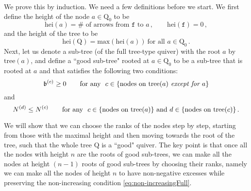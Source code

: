 \documentclass[12pt,a4paper]{article}
\renewcommand{\(}{\left(}
\renewcommand{\)}{\right)}
\renewcommand{\(}{\left(}
\renewcommand{\)}{\right)}
\begin{document}
\medskip

We prove this by induction. 
We need a few definitions before we start.
We first define the height of the node $a\in \mathrm{Q_0}$ to be
\begin{equation}
\textrm{hei}(a)=\# \textrm{ of arrows from $\mathtt{f}$ to $a$}
\,,\qquad
\textrm{hei}(\mathtt{f})=0\,,
\end{equation}
and the height of the tree to be
\begin{equation}
\textrm{hei}(\mathrm{Q})= \textrm{max}(\textrm{hei}(a)) \ \textrm{for all } a\in \mathrm{Q}_0   \,.
\end{equation}
Next, let us denote a sub-tree (of the full tree-type quiver) with the root $a$ by $\textrm{tree}(a)$, and define a ``good sub-tree" rooted at $a\in \mathrm{Q}_0$ to be a sub-tree that is rooted at $a$ and that satisfies the following two conditions:
\begin{equation}
\mathfrak{b}^{(c)}\geq 0 \qquad \textrm{for any }\ c\in \{ \textrm{nodes on  \textrm{tree}$(a)$} \textit{ except for $a$}\} 
\end{equation}
and 
\begin{equation}
N^{(d)}\leq N^{(c)}    
\qquad \textrm{for any }\ c\in \{\textrm{nodes on \textrm{tree}}(a) \} \textrm{ and }
d\in \{\textrm{nodes on \textrm{tree}}(c)\}\,.
\end{equation}



We will show that we can choose the ranks of the nodes step by step, starting from those with the maximal height and then moving towards the root of the tree, such that the whole tree $\textrm{Q}$ is a ``good" quiver.
The key point is that once all the nodes with height $n$ are the roots of good sub-trees, we can make all the nodes at height $(n-1)$ roots of good sub-trees by choosing their ranks, namely we can make all the nodes of height $n$ to have non-negative excesses while preserving the non-increasing condition \eqref{eq:non-increasingFull}. 
\end{document}
